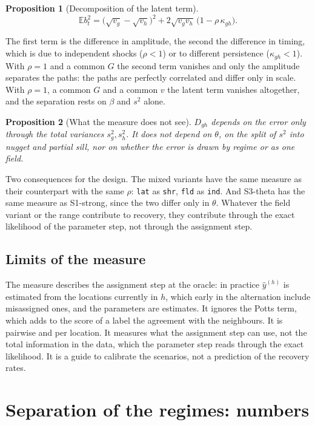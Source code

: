 \documentclass[11pt]{article}
\newcommand{\E}{\mathbb{E}}
\newtheorem{proposition}{Proposition}
\begin{document}
\begin{proposition}[Decomposition of the latent term]
\[
  \E b_t^2 = \bigl(\sqrt{v_g} - \sqrt{v_h}\bigr)^2 + 2\sqrt{v_g v_h}\,\bigl(1 - \rho\,\kappa_{gh}\bigr).
\]
\end{proposition}
The first term is the difference in amplitude, the second the difference in timing, which is due to independent shocks ($\rho < 1$) or to different persistence ($\kappa_{gh} < 1$). With $\rho = 1$ and a common $G$ the second term vanishes and only the amplitude separates the paths: the paths are perfectly correlated and differ only in scale. With $\rho = 1$, a common $G$ and a common $v$ the latent term vanishes altogether, and the separation rests on $\beta$ and $s^2$ alone.

\begin{proposition}[What the measure does not see]
$D_{gh}$ depends on the error only through the total variances $s^2_g, s^2_h$. It does not depend on $\theta$, on the split of $s^2$ into nugget and partial sill, nor on whether the error is drawn by regime or as one field.
\end{proposition}
Two consequences for the design. The mixed variants have the same measure as their counterpart with the same $\rho$: \texttt{lat} as \texttt{shr}, \texttt{fld} as \texttt{ind}. And S3-theta has the same measure as S1-strong, since the two differ only in $\theta$. Whatever the field variant or the range contribute to recovery, they contribute through the exact likelihood of the parameter step, not through the assignment step.

\subsection{Limits of the measure}

The measure describes the assignment step at the oracle: in practice $\hat y^{(h)}$ is estimated from the locations currently in $h$, which early in the alternation include misassigned ones, and the parameters are estimates. It ignores the Potts term, which adds to the score of a label the agreement with the neighbours. It is pairwise and per location. It measures what the assignment step can use, not the total information in the data, which the parameter step reads through the exact likelihood. It is a guide to calibrate the scenarios, not a prediction of the recovery rates.

\section{Separation of the regimes: numbers}\label{sec:sepnum}
\end{document}
